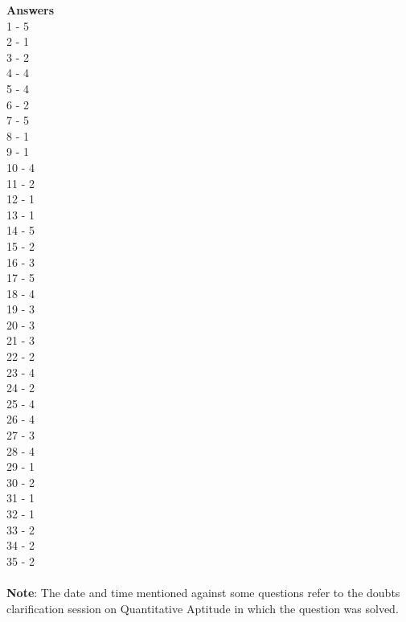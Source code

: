 \documentclass[
]{article}
\begin{document}
{\large \textbf{Answers \\}}
1 - 5 \\
2 - 1 \\
3 - 2 \\
4 - 4 \\
5 - 4 \\
6 - 2 \\
7 - 5 \\
8 - 1 \\
9 - 1 \\
10 - 4 \\
11 - 2 \\
12 - 1 \\
13 - 1 \\
14 - 5 \\
15 - 2 \\
16 - 3 \\
17 - 5 \\
18 - 4 \\
19 - 3 \\
20 - 3 \\
21 - 3 \\
22 - 2 \\
23 - 4 \\
24 - 2 \\
25 - 4 \\
26 - 4 \\
27 - 3 \\
28 - 4 \\
29 - 1 \\
30 - 2 \\
31 - 1 \\
32 - 1 \\
33 - 2 \\
34 - 2 \\
35 - 2 \\
\textbf{\\ Note}: The date and time mentioned against some questions refer to the doubts clarification
session on Quantitative Aptitude in which the question was solved.
\end{document}
